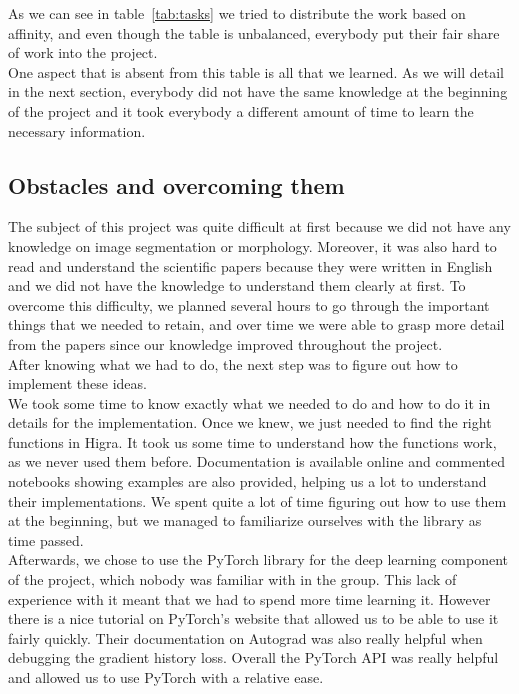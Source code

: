 As we can see in table~\ref{tab:tasks} we tried to distribute the work based on
affinity, and even though the table is unbalanced, everybody put their fair
share of work into the project.\\

One aspect that is absent from this table is all that we learned.
As we will detail in the next section, everybody did not have the same knowledge
at the beginning of the project and it took everybody a different amount of
time to learn the necessary information.\\

\subsection{Obstacles and overcoming them}

The subject of this project was quite difficult at first because we did not have
any knowledge on image segmentation or morphology. Moreover, it was also hard to read and
understand the scientific papers because they were written in English and
we did not have the knowledge to understand them clearly at first. To overcome this difficulty, we planned several
hours to go through the important things that we needed to retain, and over
time we were able to grasp more detail from the papers since our knowledge
improved throughout the project.\\

After knowing what we had to do, the next step was to figure out how to implement
these ideas.\\
We took some time to know exactly what we needed to do and how to do it in details for the implementation.
Once we knew, we just needed to find the right functions in Higra.
It took us some time to understand how the functions work, as we never used them before.
Documentation is available online and commented notebooks showing examples 
are also provided, helping us a lot to understand their implementations. 
We spent quite a lot of time figuring out how to use them at the beginning, 
but we managed to familiarize ourselves with the library as time passed.\\

Afterwards, we chose to use the PyTorch library for the deep learning
component of the project, which nobody was familiar with in the group. 
This lack of experience with it meant that we had to spend more time learning
it. However there is a nice tutorial on PyTorch's website that allowed us to
be able to use it fairly quickly. Their documentation on Autograd was also
really helpful when debugging the gradient history loss. Overall the PyTorch
API was really helpful and allowed us to use PyTorch with a relative ease.\\

